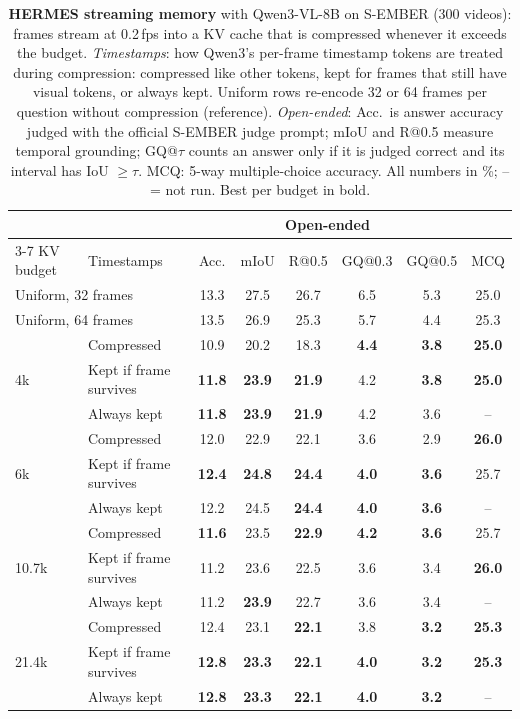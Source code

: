 \begin{table}[t]
\centering
\setlength{\tabcolsep}{7pt}
\caption{\textbf{HERMES streaming memory} with Qwen3-VL-8B on S-EMBER (300 videos): frames stream at 0.2\,fps into a KV cache that is compressed whenever it exceeds the budget. \emph{Timestamps}: how Qwen3's per-frame timestamp tokens are treated during compression: compressed like other tokens, kept for frames that still have visual tokens, or always kept. Uniform rows re-encode 32 or 64 frames per question without compression (reference). \emph{Open-ended}: Acc.\ is answer accuracy judged with the official S-EMBER judge prompt; mIoU and R@0.5 measure temporal grounding; GQ@$\tau$ counts an answer only if it is judged correct and its interval has IoU $\geq \tau$. MCQ: 5-way multiple-choice accuracy. All numbers in \%; -- = not run. Best per budget in bold.}
\label{tab:hermes-budgets}
\begin{tabular}{llcccccc}
\toprule
& & \multicolumn{5}{c}{Open-ended} & \\
\cmidrule(lr){3-7}
KV budget & Timestamps & Acc. & mIoU & R@0.5 & GQ@0.3 & GQ@0.5 & MCQ \\
\midrule
\multicolumn{2}{l}{Uniform, 32 frames} & 13.3 & 27.5 & 26.7 & 6.5 & 5.3 & 25.0 \\
\multicolumn{2}{l}{Uniform, 64 frames} & 13.5 & 26.9 & 25.3 & 5.7 & 4.4 & 25.3 \\
\midrule
\multirow{3}{*}{4k} & Compressed & 10.9 & 20.2 & 18.3 & \textbf{4.4} & \textbf{3.8} & \textbf{25.0} \\
 & Kept if frame survives & \textbf{11.8} & \textbf{23.9} & \textbf{21.9} & 4.2 & \textbf{3.8} & \textbf{25.0} \\
 & Always kept & \textbf{11.8} & \textbf{23.9} & \textbf{21.9} & 4.2 & 3.6 & -- \\
\midrule
\multirow{3}{*}{6k} & Compressed & 12.0 & 22.9 & 22.1 & 3.6 & 2.9 & \textbf{26.0} \\
 & Kept if frame survives & \textbf{12.4} & \textbf{24.8} & \textbf{24.4} & \textbf{4.0} & \textbf{3.6} & 25.7 \\
 & Always kept & 12.2 & 24.5 & \textbf{24.4} & \textbf{4.0} & \textbf{3.6} & -- \\
\midrule
\multirow{3}{*}{10.7k} & Compressed & \textbf{11.6} & 23.5 & \textbf{22.9} & \textbf{4.2} & \textbf{3.6} & 25.7 \\
 & Kept if frame survives & 11.2 & 23.6 & 22.5 & 3.6 & 3.4 & \textbf{26.0} \\
 & Always kept & 11.2 & \textbf{23.9} & 22.7 & 3.6 & 3.4 & -- \\
\midrule
\multirow{3}{*}{21.4k} & Compressed & 12.4 & 23.1 & \textbf{22.1} & 3.8 & \textbf{3.2} & \textbf{25.3} \\
 & Kept if frame survives & \textbf{12.8} & \textbf{23.3} & \textbf{22.1} & \textbf{4.0} & \textbf{3.2} & \textbf{25.3} \\
 & Always kept & \textbf{12.8} & \textbf{23.3} & \textbf{22.1} & \textbf{4.0} & \textbf{3.2} & -- \\
\bottomrule
\end{tabular}
\end{table}
